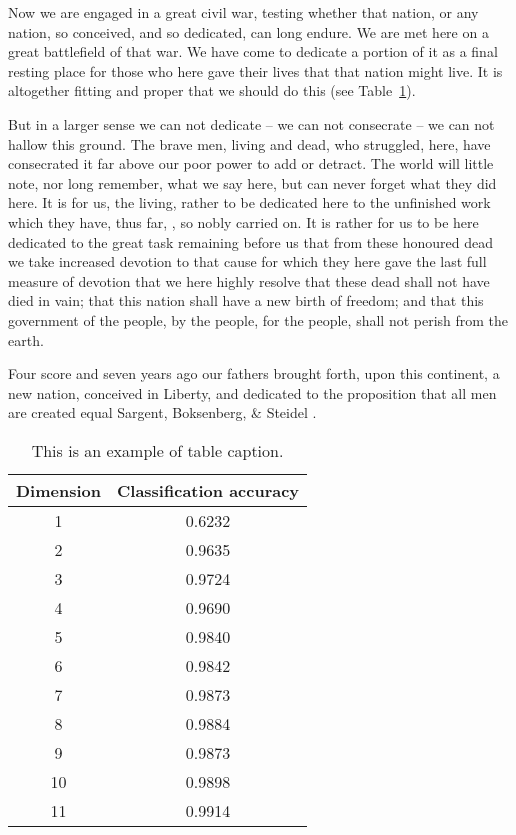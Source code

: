 \documentclass{pasa}%
\begin{document}
Now we are engaged in a great civil war, testing whether that nation, \cite{abt1967} or any nation, so conceived, and so dedicated, can long endure. We are met here on a great battlefield of that war. We have come to dedicate a portion of it as a final resting place for those who here gave their lives that that nation might live. It is altogether fitting and proper that we should do this (see Table~\ref{tab1}).

But in a larger sense we can not dedicate -- we can not consecrate -- we can not hallow this ground. The brave men, living and dead, who struggled, here, have consecrated it far above our poor power to add or detract. The world will little note, nor long remember, what we say here, but can never forget what they did here. It is for us, the living, rather to be dedicated here to the unfinished work which they have, thus far, \citet{lwt}, so nobly carried on. It is rather for us to be here dedicated to the great task remaining before us  that from these honoured dead we take increased devotion to that cause for which they here gave the last full measure of devotion  that we here highly resolve that these dead shall not have died in vain; that this nation shall have a new birth of freedom; and that this government of the people, by the people, for the people, shall not perish from the earth.

Four score and seven years ago our fathers brought forth, upon this continent, a new nation, conceived in Liberty, and dedicated to the proposition that all men are created equal Sargent, Boksenberg, \& Steidel \citet{sbs}.

\begin{table}
\caption{This is an example of table caption.}
\centering
\begin{tabular}{@{}cc@{}}
\hline\hline
Dimension & Classification accuracy \\
\hline%
 1  & 0.6232 \\
 2  & 0.9635 \\ 
 3  & 0.9724 \\ 
 4  & 0.9690 \\ 
 5  & 0.9840 \\ 
 6  & 0.9842 \\ 
 7  & 0.9873 \\ 
 8  & 0.9884 \\
 9  & 0.9873 \\ 
 10 & 0.9898 \\ 
 11 & 0.9914 \\
\hline\hline
\end{tabular}
\label{tab1}
\end{table}
\end{document}

